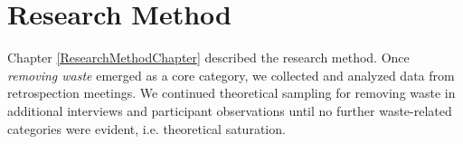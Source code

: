 

\section{Research Method}
\label{WasteResearchMethod}

Chapter \ref{ResearchMethodChapter} described the research method. Once \textit{removing waste} emerged as a core category, we collected and analyzed data from retrospection meetings. We continued theoretical sampling for removing waste in additional interviews and participant observations until no further waste-related categories were evident, i.e. theoretical saturation. 




